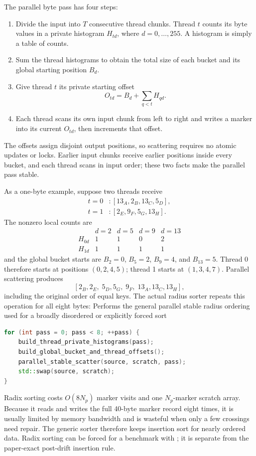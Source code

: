 The parallel byte pass has four steps:
\begin{enumerate}
\item Divide the input into \(T\) consecutive thread chunks.  Thread \(t\)
      counts its byte values in a private histogram \(H_{td}\), where
      \(d=0,\ldots,255\).  A histogram is simply a table of counts.
\item Sum the thread histograms to obtain the total size of each bucket and
      its global starting position \(B_d\).
\item Give thread \(t\) its private starting offset
      \[
       O_{td}=B_d+\sum_{q<t}H_{qd}.
      \]
\item Each thread scans its own input chunk from left to right and writes a
      marker into its current \(O_{td}\), then increments that offset.
\end{enumerate}
The offsets assign disjoint output positions, so scattering requires no
atomic updates or locks.  Earlier input chunks receive earlier positions
inside every bucket, and each thread scans in input order; these two facts
make the parallel pass stable.

As a one-byte example, suppose two threads receive
\[
\begin{split}
 t=0 &: [13_A,2_B,13_C,5_D],\\
 t=1 &: [2_E,9_F,5_G,13_H].
\end{split}
\]
The nonzero local counts are
\[
\begin{array}{c|rrrr}
 &d=2&d=5&d=9&d=13\\ \hline
H_{0d}&1&1&0&2\\
H_{1d}&1&1&1&1
\end{array}
\]
and the global bucket starts are \(B_2=0\), \(B_5=2\), \(B_9=4\), and
\(B_{13}=5\).  Thread 0 therefore starts at positions
\((0,2,4,5)\); thread 1 starts at \((1,3,4,7)\).  Parallel scattering produces
\[
 [2_B,2_E,\;5_D,5_G,\;9_F,\;13_A,13_C,13_H],
\]
including the original order of equal keys.  The actual radius sorter repeats
this operation for all eight bytes:
{}
{Performs the general parallel stable radius ordering used for a broadly
 disordered or explicitly forced sort}
\begin{lstlisting}[language=C++]
for (int pass = 0; pass < 8; ++pass) {
    build_thread_private_histograms(pass);
    build_global_bucket_and_thread_offsets();
    parallel_stable_scatter(source, scratch, pass);
    std::swap(source, scratch);
}
\end{lstlisting}
Radix sorting costs \(O(8N_p)\) marker visits and one \(N_p\)-marker scratch
array.  Because it reads and writes the full 40-byte marker record eight
times, it is usually limited by memory bandwidth and is wasteful when only a
few crossings need repair.  The generic sorter therefore keeps insertion
sort for nearly ordered data.  Radix sorting can be forced for a benchmark
with ; it is separate from the
paper-exact post-drift insertion rule.

